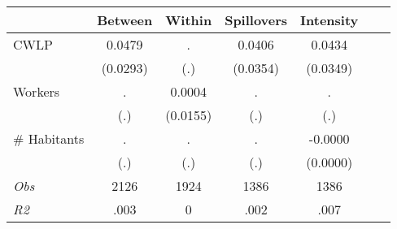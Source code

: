 \begin{tabular}{l*{6}{c}}\hline&\multicolumn{1}{c}{Between}&\multicolumn{1}{c}{Within}&\multicolumn{1}{c}{Spillovers}&\multicolumn{1}{c}{Intensity}\\ \hline 
CWLP & 0.0479 & . & 0.0406 & 0.0434 \\
 & (0.0293) & (.) & (0.0354) & (0.0349) \\
Workers & . & 0.0004 & . & . \\
 & (.) & (0.0155) & (.) & (.) \\
\# Habitants & . & . & . & -0.0000 \\
  & (.) & (.) & (.) & (0.0000) \\
\hline \textit{Obs} & 2126 & 1924 & 1386 & 1386  \\ \textit{R2} & .003 & 0 & .002 & .007 \\ \hline \end{tabular}
